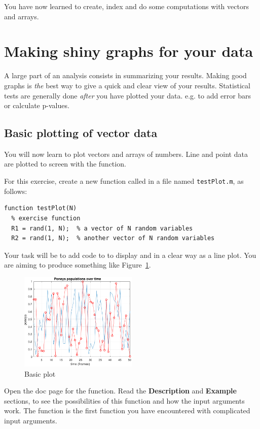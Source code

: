 \documentclass{article}
\begin{document}
You have now learned to create, index and do some computations with vectors and arrays.


\pagebreak
\section{Making shiny graphs for your data}

A large part of an analysis consists in summarizing your results.
Making good graphs is \emph{the} best way to give a quick and clear view of your results.
Statistical tests are generally done \emph{after} you have plotted your data. e.g. to add error bars or calculate p-values.


\subsection{Basic plotting of vector data}

You will now learn to plot vectors and arrays of numbers.
Line and point data are plotted to screen with the  function.

For this exercise, create a new function called  in a file named \texttt{testPlot.m}, as follows:
\begin{lstlisting}
function testPlot(N)
  % exercise function
  R1 = rand(1, N);  % a vector of N random variables
  R2 = rand(1, N);  % another vector of N random variables
\end{lstlisting}

Your task will be to add code to  to display  and  in a clear way as a line plot.
You are aiming to produce something like Figure~\ref{fig:basic}.
\begin{figure}[h]
  \centering
  \includegraphics[width=0.5\textwidth]{figs/basicplot.pdf}
  \caption{Basic plot}\label{fig:basic}
\end{figure}

Open the doc page for the  function.
Read the \textbf{Description} and \textbf{Example} sections, to see the possibilities of this function and how the input arguments work.
The  function is the first function you have encountered with complicated input arguments.
\end{document}
